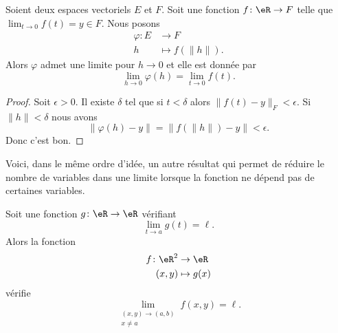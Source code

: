 \begin{lemma}
    Soient deux espaces vectoriels \( E\) et \( F\). Soit une fonction \( f\colon \eR\to F\) telle que \( \lim_{t\to 0} f(t)=y\in F\). Nous posons 
    \begin{equation}
        \begin{aligned}
            \varphi\colon E&\to F \\
            h&\mapsto f(\| h \|). 
        \end{aligned}
    \end{equation}
    Alors \( \varphi\) admet une limite pour \( h\to 0\) et elle est donnée par
    \begin{equation}
        \lim_{h\to 0} \varphi(h)=\lim_{t\to 0} f(t).
    \end{equation}
\end{lemma}

\begin{proof}
    Soit \( \epsilon>0\). Il existe \( \delta\) tel que si \( t<\delta\) alors \( \| f(t)-y \|_F<\epsilon\). Si \( \| h \|<\delta\) nous avons
    \begin{equation}
        \| \varphi(h)-y \|=\| f(\| h \|)-y \|<\epsilon.
    \end{equation}
    Donc c'est bon.
\end{proof}

Voici, dans le même ordre d'idée, un autre résultat qui permet de réduire le nombre de variables dans une limite lorsque la fonction ne dépend pas de certaines variables.

\begin{lemma}        \label{LEMooYLIHooFBQyzC}
    Soit une fonction \( g\colon \eR\to \eR\) vérifiant
    \begin{equation}
        \lim_{t\to a} g(t)=\ell.
    \end{equation}
    Alors la fonction
    \begin{equation}
        \begin{aligned}
            f\colon \eR^2&\to \eR \\
            (x,y)&\mapsto g(x) 
        \end{aligned}
    \end{equation}
    vérifie
    \begin{equation}
        \lim_{\substack{(x,y)\to(a,b)\\x\neq a}} f(x,y)=\ell.
    \end{equation}
\end{lemma}

